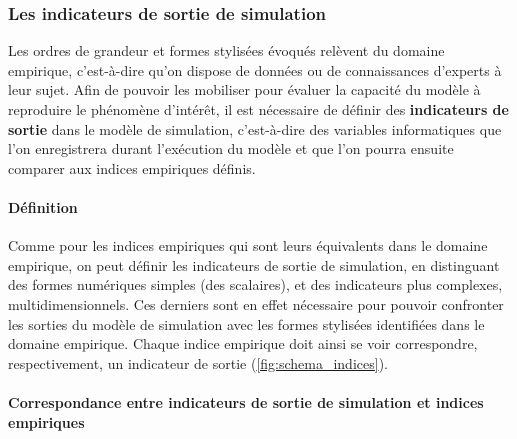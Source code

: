 
\subsubsection{Les indicateurs de sortie de simulation}


Les ordres de grandeur et formes stylisées évoqués relèvent du domaine empirique, c'est-à-dire qu'on dispose de données ou de connaissances d'experts à leur sujet.
Afin de pouvoir les mobiliser pour évaluer la capacité du modèle à reproduire le phénomène d'intérêt, il est nécessaire de définir des \textbf{indicateurs de sortie} dans le modèle de simulation, c'est-à-dire des variables informatiques que l'on enregistrera durant l'exécution du modèle et que l'on pourra ensuite comparer aux indices empiriques définis.


\paragraph{Définition}
Comme pour les indices empiriques qui sont leurs équivalents dans le domaine empirique, on peut définir les indicateurs de sortie de simulation, en distinguant des formes numériques simples (des scalaires), et des indicateurs plus complexes, multidimensionnels.
Ces derniers sont en effet nécessaire pour pouvoir confronter les sorties du modèle de simulation avec les formes stylisées identifiées dans le domaine empirique.
Chaque indice empirique doit ainsi se voir correspondre, respectivement, un indicateur de sortie (\cref{fig:schema_indices}).

\paragraph{Correspondance entre indicateurs de sortie de simulation et indices empiriques}\label{para:correspondance}

